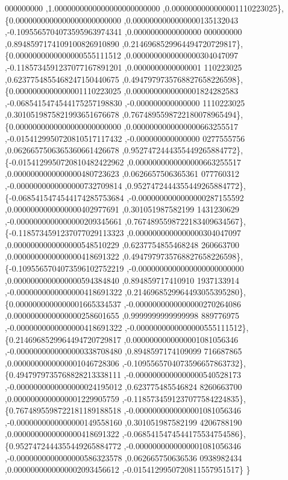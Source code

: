 \begin{DoxyCode}
      000000000 ,1.0000000000000000000000000 ,0.0000000000000001110223025\},
\{0.0000000000000000000000000 ,0.0000000000000000135132043 ,-0.1095565704073595963974341 ,0.0000000000000000
      000000000 ,0.8948597174109100826910890 ,0.2146968529964494720729817\},
\{0.0000000000000000555111512 ,0.0000000000000000304047097 ,-0.1185734591237077167891201 ,0.0000000000000001
      110223025 ,0.6237754855468247150440675 ,0.4947979735768827658226598\},
\{0.0000000000000001110223025 ,0.0000000000000001824282583 ,-0.0685415474544175257198830 ,-0.000000000000000
      1110223025 ,0.3010519875821993651676678 ,0.7674895598722180078965494\},
\{0.0000000000000000000000000 ,0.0000000000000000663255517 ,-0.0154129950720810517117432 ,-0.000000000000000
      0277555756 ,0.0626657506365360661426678 ,0.9527472444355449265884772\},
\{-0.0154129950720810482422962 ,0.0000000000000000663255517 ,0.0000000000000000480723623 ,0.0626657506365361
      077760312 ,-0.0000000000000000732709814 ,0.9527472444355449265884772\},
\{-0.0685415474544174285753684 ,-0.0000000000000000287155592 ,0.0000000000000000402977691 ,0.301051987582199
      1431230629 ,-0.0000000000000000209345661 ,0.7674895598722183409634567\},
\{-0.1185734591237077029113323 ,0.0000000000000000304047097 ,0.0000000000000000548510229 ,0.6237754855468248
      260663700 ,0.0000000000000000418691322 ,0.4947979735768827658226598\},
\{-0.1095565704073596102752219 ,-0.0000000000000000000000000 ,0.0000000000000000594384840 ,0.894859717410910
      1937133914 ,-0.0000000000000000418691322 ,0.2146968529964493055395280\},
\{0.0000000000000001665334537 ,-0.0000000000000000270264086 ,0.0000000000000000258601655 ,0.9999999999999998
      889776975 ,-0.0000000000000000418691322 ,-0.0000000000000000555111512\},
\{0.2146968529964494720729817 ,0.0000000000000001081056346 ,-0.0000000000000000338708480 ,0.8948597174109099
      716687865 ,0.0000000000000001046728306 ,-0.1095565704073596657863732\},
\{0.4947979735768828213338111 ,-0.0000000000000000540528173 ,-0.0000000000000000024195012 ,0.623775485546824
      8260663700 ,0.0000000000000001229905759 ,-0.1185734591237077584224835\},
\{0.7674895598722181189188518 ,-0.0000000000000001081056346 ,-0.0000000000000000149558160 ,0.301051987582199
      4206788190 ,0.0000000000000000418691322 ,-0.0685415474544175534754586\},
\{0.9527472444355449265884772 ,-0.0000000000000001081056346 ,-0.0000000000000000586323578 ,0.062665750636536
      0938982434 ,0.0000000000000002093456612 ,-0.0154129950720811557951517\}
\}
\end{DoxyCode}
\mbox{\label{a00990_a01a7e740e28b6427d312ce171c44f6dd}} 
